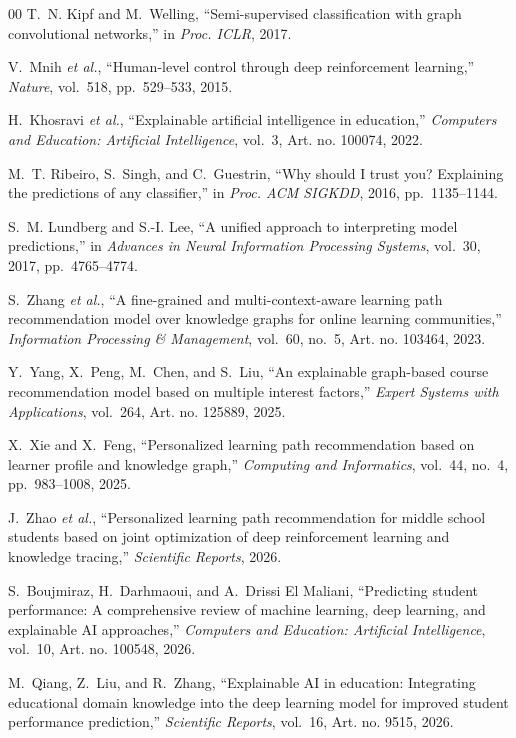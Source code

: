 \documentclass[conference]{IEEEtran}
\begin{document}
\begin{thebibliography}{00}
T.~N. Kipf and M.~Welling, ``Semi-supervised classification with graph convolutional
networks,'' in \emph{Proc. ICLR}, 2017.

V.~Mnih \emph{et al.}, ``Human-level control through deep reinforcement learning,''
\emph{Nature}, vol.~518, pp.~529--533, 2015.

H.~Khosravi \emph{et al.}, ``Explainable artificial intelligence in education,''
\emph{Computers and Education: Artificial Intelligence}, vol.~3, Art. no. 100074, 2022.

M.~T. Ribeiro, S.~Singh, and C.~Guestrin, ``Why should I trust you? Explaining the
predictions of any classifier,'' in \emph{Proc. ACM SIGKDD}, 2016, pp.~1135--1144.

S.~M. Lundberg and S.-I. Lee, ``A unified approach to interpreting model predictions,''
in \emph{Advances in Neural Information Processing Systems}, vol.~30, 2017, pp.~4765--4774.

S.~Zhang \emph{et al.}, ``A fine-grained and multi-context-aware learning path
recommendation model over knowledge graphs for online learning communities,''
\emph{Information Processing \& Management}, vol.~60, no.~5, Art. no. 103464, 2023.

Y.~Yang, X.~Peng, M.~Chen, and S.~Liu, ``An explainable graph-based course recommendation
model based on multiple interest factors,'' \emph{Expert Systems with Applications},
vol.~264, Art. no. 125889, 2025.

X.~Xie and X.~Feng, ``Personalized learning path recommendation based on learner profile
and knowledge graph,'' \emph{Computing and Informatics}, vol.~44, no.~4, pp.~983--1008,
2025.

J.~Zhao \emph{et al.}, ``Personalized learning path recommendation for middle school
students based on joint optimization of deep reinforcement learning and knowledge
tracing,'' \emph{Scientific Reports}, 2026.

S.~Boujmiraz, H.~Darhmaoui, and A.~Drissi El Maliani, ``Predicting student performance: A
comprehensive review of machine learning, deep learning, and explainable AI approaches,''
\emph{Computers and Education: Artificial Intelligence}, vol.~10, Art. no. 100548, 2026.

M.~Qiang, Z.~Liu, and R.~Zhang, ``Explainable AI in education: Integrating educational
domain knowledge into the deep learning model for improved student performance
prediction,'' \emph{Scientific Reports}, vol.~16, Art. no. 9515, 2026.


\end{thebibliography}
\end{document}
